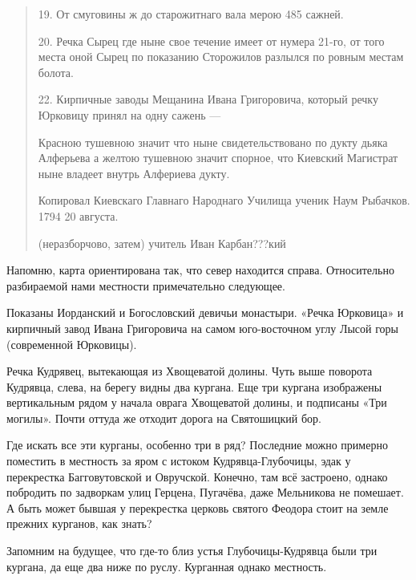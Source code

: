 \begin{quotation}
19. От смуговины ж до старожитнаго вала мерою 485 сажней.

20. Речка Сырец где ныне свое течение имеет от нумера 21-го, от того места оной Сырец по показанию Сторожилов разлылся по ровным местам болота. 

22. Кирпичные заводы Мещанина Ивана Григоровича, который речку Юрковицу принял на одну сажень ---

Красною тушевною значит что ныне свидетельствовано по дукту дьяка Алферьева а желтою тушевною значит спорное, что Киевский Магистрат ныне владеет внутрь Алфериева дукту.

Копировал Киевскаго Главнаго Народнаго Училища ученик Наум Рыбачков. 1794 20 августа.

(неразборчово, затем) учитель Иван Карбан???кий
\end{quotation}

Напомню, карта ориентирована так, что север находится справа. Относительно разбираемой нами местности примечательно следующее.

Показаны Иорданский и Богословский девичьи монастыри. «Речка Юрковица» и кирпичный завод Ивана Григоровича на самом юго-восточном углу Лысой горы (современной Юрковицы).

Речка Кудрявец, вытекающая из Хвощеватой долины. Чуть выше поворота Кудрявца, слева, на берегу видны два кургана. Еще три кургана изображены вертикальным рядом у начала оврага Хвощеватой долины, и подписаны «Три могилы». Почти оттуда же отходит дорога на Святошицкий бор. 

Где искать все эти курганы, особенно три в ряд? Последние можно примерно поместить в местность за яром с истоком Кудрявца-Глубочицы, эдак у перекрестка Багговутовской и Овручской. Конечно, там всё застроено, однако побродить по задворкам улиц Герцена, Пугачёва, даже Мельникова не помешает. А быть может бывшая у перекрестка церковь святого Феодора стоит на земле прежних курганов, как знать?

Запомним на будущее, что где-то близ устья Глубо\-чицы-Кудрявца были три кургана, да еще два ниже по руслу. Курганная однако местность.
